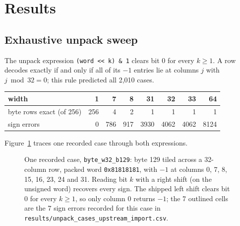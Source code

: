 \documentclass[11pt]{article}
\begin{document}
\section{Results}
\subsection{Exhaustive unpack sweep}
The unpack expression \texttt{(word << k) \& 1} clears bit 0 for every $k \ge 1$. A row decodes
exactly if and only if all of its $-1$ entries lie at columns $j$ with $j \bmod 32 = 0$; this rule
predicted all 2{,}010 cases.

\begin{center}
\begin{tabular}{lrrrrrrr}
\hline
width & 1 & 7 & 8 & 31 & 32 & 33 & 64 \\
\hline
byte rows exact (of 256) & 256 & 4 & 2 & 1 & 1 & 1 & 1 \\
sign errors & 0 & 786 & 917 & 3930 & 4062 & 4062 & 8124 \\
\hline
\end{tabular}
\end{center}

Figure~\ref{fig:shift} traces one recorded case through both expressions.

\begin{figure}[h]
\centering
{}
\caption{One recorded case, \texttt{byte\_w32\_b129}: byte 129 tiled across a 32-column row, packed
word \texttt{0x81818181}, with $-1$ at columns 0, 7, 8, 15, 16, 23, 24 and 31. Reading bit $k$ with a
right shift (on the unsigned word) recovers every sign. The shipped left shift clears bit 0 for
every $k \ge 1$, so only column 0 returns $-1$; the 7 outlined cells are the 7 sign errors recorded
for this case in \texttt{results/unpack\_cases\_upstream\_import.csv}.}
\label{fig:shift}
\end{figure}
\end{document}
